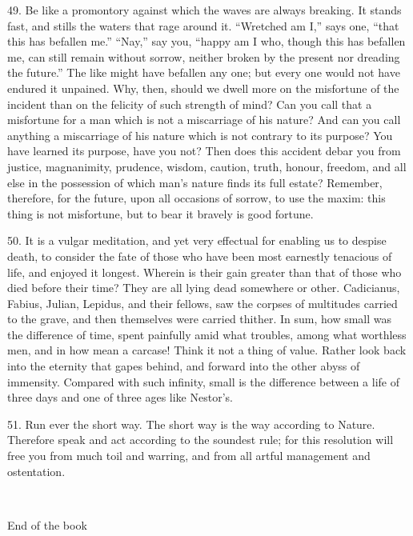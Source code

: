 \documentclass{book}
\newcommand\terminus[1]{\vspace{2em}\emph{#1} \\[2em] \begin{center}End of the \ordinalstring{chapter} book\end{center}}
\begin{document}
49. Be like a promontory against which the waves are always
breaking. It stands fast, and stills the waters that rage around
it. ``Wretched am I,'' says one, ``that this has befallen me.'' ``Nay,'' say
you, ``happy am I who, though this has befallen me, can still remain
without sorrow, neither broken by the present nor dreading the
future.'' The like might have befallen any one; but every one would not
have endured it unpained. Why, then, should we dwell more on the
misfortune of the incident than on the felicity of such strength of
mind? Can you call that a misfortune for a man which is not a
miscarriage of his nature?  And can you call anything a miscarriage of
his nature which is not contrary to its purpose? You have learned its
purpose, have you not?  Then does this accident debar you from
justice, magnanimity, prudence, wisdom, caution, truth, honour,
freedom, and all else in the possession of which man's nature finds
its full estate? Remember, therefore, for the future, upon all
occasions of sorrow, to use the maxim: this thing is not misfortune,
but to bear it bravely is good fortune.

50. It is a vulgar meditation, and yet very effectual for enabling us
to despise death, to consider the fate of those who have been most
earnestly tenacious of life, and enjoyed it longest. Wherein is their
gain greater than that of those who died before their time? They are
all lying dead somewhere or other. Cadicianus, Fabius, Julian,
Lepidus, and their fellows, saw the corpses of multitudes carried to
the grave, and then themselves were carried thither. In sum, how small
was the difference of time, spent painfully amid what troubles, among
what worthless men, and in how mean a carcase! Think it not a thing of
value. Rather look back into the eternity that gapes behind, and
forward into the other abyss of immensity. Compared with such
infinity, small is the difference between a life of three days and one
of three ages like Nestor's.

51. Run ever the short way. The short way is the way according to
Nature. Therefore speak and act according to the soundest rule; for
this resolution will free you from much toil and warring, and from all
artful management and ostentation.

\terminus{}

\chapter[In the morning,...]{}
\end{document}

